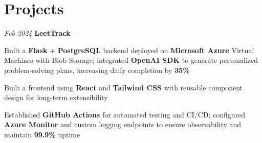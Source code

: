 \section{Projects}

\begin{twocolentry}{
    \textit{Feb 2024}
}{
    \textbf{LeetTrack} -- 
}
\end{twocolentry}
\begin{onecolentry}
    \begin{highlights}
        \item Built a \textbf{Flask} + \textbf{PostgreSQL} backend deployed on \textbf{Microsoft Azure} Virtual Machines with Blob Storage; integrated \textbf{OpenAI SDK} to generate personalized problem-solving plans, increasing daily completion by \textbf{35\%}
        \item Built a frontend using \textbf{React} and \textbf{Tailwind CSS} with reusable component design for long-term extensibility
        \item Established \textbf{GitHub Actions} for automated testing and CI/CD; configured \textbf{Azure Monitor} and custom logging endpoints to ensure observability and maintain \textbf{99.9\%} uptime
    \end{highlights}
\end{onecolentry}
